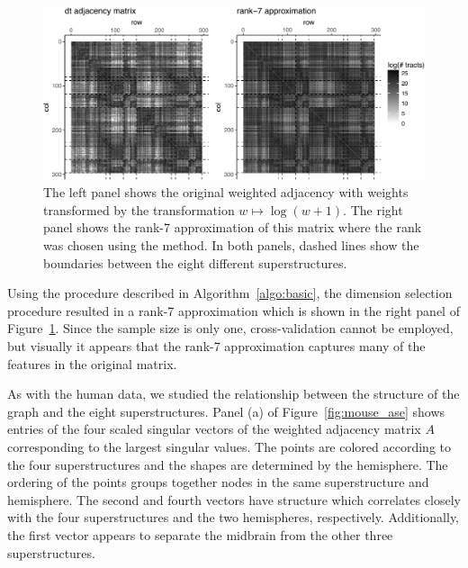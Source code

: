\documentclass[journal,twoside,web]{ieeecolor}
\begin{document}
\begin{figure}[tbh!]
	\centering
	\includegraphics[width=\linewidth]{mouse_adj_v_Phat.pdf}
	\caption{The left panel shows the original weighted adjacency with weights transformed by the transformation $w\mapsto \log(w+1)$. 
	The right panel shows the rank-7 approximation of this matrix where the rank was chosen using the \cite{zhu2006automatic} method.
	In both panels, dashed lines show the boundaries between the eight different superstructures. }
	\label{fig:mouse_adj_lr}
\end{figure}

Using the procedure described in Algorithm~\ref{algo:basic}, the \cite{zhu2006automatic} dimension selection procedure resulted in a rank-7 approximation which is shown in the right panel of Figure~\ref{fig:mouse_adj_lr}.
Since the sample size is only one, cross-validation cannot be employed, but visually it appears that the rank-7 approximation captures many of the features in the original matrix.

As with the human data, we studied the relationship between the structure of the graph and the eight superstructures.
Panel (a) of Figure~\ref{fig:mouse_ase} shows entries of the four scaled singular vectors  of the weighted adjacency matrix $A$ corresponding to the largest singular values. 
The points are colored according to the four superstructures and the shapes are determined by the hemisphere. 
The ordering of the points groups together nodes in the same superstructure and hemisphere.
The second and fourth vectors have structure which correlates closely with the four superstructures and the two hemispheres, respectively.
Additionally, the first vector appears to separate the midbrain from the other three superstructures.
\end{document}

